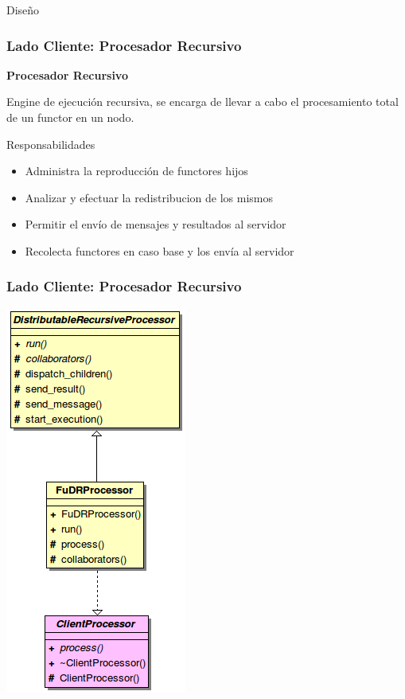 \begin{subsection}{Diseño}
\begin{frame}\frametitle{Lado Cliente: Procesador Recursivo} %
    \textbf{Procesador Recursivo}
    
    Engine de ejecución recursiva, se encarga de llevar a cabo el procesamiento total de un functor en un nodo.

    \begin{block}{Responsabilidades}
        \begin{itemize}
        \item Administra la reproducción de functores hijos
        \item Analizar y efectuar la redistribucion de los mismos
        \item Permitir el envío de mensajes y resultados al servidor
        \item Recolecta functores en caso base y los envía al servidor
        \end{itemize}
    \end{block}
\end{frame}

\begin{frame}\frametitle{Lado Cliente: Procesador Recursivo} %
    \begin{center}
         \includegraphics[scale=0.4]{images/frp.png}
    \end{center}
\end{frame}


\end{subsection}
